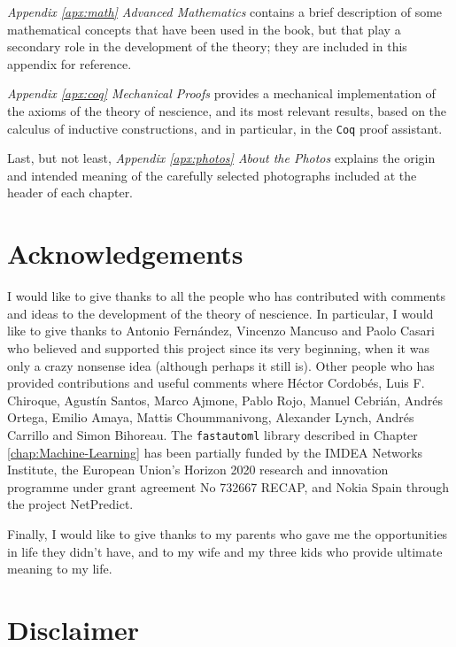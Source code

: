 \emph{Appendix \ref{apx:math} Advanced Mathematics} contains a brief description of some mathematical concepts that have been used in the book, but that play a secondary role in the development of the theory; they are included in this appendix for reference.

\emph{Appendix \ref{apx:coq} Mechanical Proofs} provides a mechanical implementation of the axioms of the theory of nescience, and its most relevant results, based on the calculus of inductive constructions, and in particular, in the \texttt{Coq} proof assistant.

Last, but not least, \emph{Appendix \ref{apx:photos} About the Photos} explains the origin and intended meaning of the carefully selected photographs included at the header of each chapter.

%
%

\section*{Acknowledgements}

I would like to give thanks to all the people who has contributed with comments and ideas to the development of the theory of nescience. In particular, I would like to give thanks to Antonio Fernández, Vincenzo Mancuso and Paolo Casari who believed and supported this project since its very beginning, when it was only a crazy nonsense idea (although perhaps it still is). Other people who has provided contributions and useful comments where Héctor Cordobés, Luis F. Chiroque, Agustín Santos, Marco Ajmone, Pablo Rojo, Manuel Cebrián, Andrés Ortega, Emilio Amaya, Mattis Choummanivong, Alexander Lynch, Andrés Carrillo and Simon Bihoreau. The \texttt{fastautoml} library described in Chapter \ref{chap:Machine-Learning} has been partially funded by the IMDEA Networks Institute, the European Union's Horizon 2020 research and innovation programme under grant agreement No 732667 RECAP, and Nokia Spain through the project NetPredict.

Finally, I would like to give thanks to my parents who gave me the opportunities in life they didn't have, and to my wife and my three kids who provide ultimate meaning to my life.

%
%

\section*{Disclaimer}

